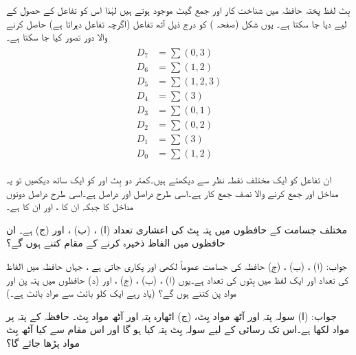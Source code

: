  بِٹ لفظ پختہ حافظہ میں شناخت کار اور  جمع گیٹ موجود ہوتے ہیں لہٰذا اس کو  تفاعل کے حصول کے لیے  دیا جا سکتا ہے۔ یوں شکل    (صفحہ ) کو درج ذیل آٹھ تفاعل (اگرچہ  تفاعل  دہراتا ہے) حاصل کرنے والا دور تصور کیا جا سکتا ہے۔
\begin{gather}
\begin{aligned}
D_7&=\sum (0,3)\\
D_6&=\sum(1,2)\\
D_5&=\sum (1,2,3)\\
D_4&=\sum(3)\\
D_3&=\sum(0,1)\\
D_2&=\sum (0,2)\\
D_1&=\sum(3)\\
D_0&=\sum(1,2)
\end{aligned}
\end{gather}

ان تفاعل کو ایک مختلف نقطہ نظر سے دیکھتے ہیں۔کمتر دو بِٹ  اور  کو ایک ساتھ  دیکھیں تو یہ مداخل  اور  جمع کرنے والا نصف جمع کار ہے۔اسی طرح  دراصل  اور  دراصل  ہے۔اسی طرح  دراصل دونوں مداخل کا  جبکہ  ان کا ،   اور  ان کا ہے۔

  مختلف جسامت کے حافظوں میں پتہ بِٹ  کی  اعشاری تعداد  (ا) ، (ب) ، اور  (ج)   ہے۔  ان حافظوں میں الفاظ ذخیرہ کرنے کے  مقام کتنے  ہوں گے؟
  
  جواب: (ا)  ، (ب) ، (ج) 
 حافظہ کی  جسامت  عموماً  لکھی اور پکاری جاتی ہے ، جہاں   حافظہ میں الفاظ کی تعداد اور  ایک لفظ میں بِٹوں کی تعداد  ہے۔یوں  (ا) ،  (ب)   ، (ج)  ، اور (د)     حافظوں میں پتہ پن  اور  مواد پن کتنے  ہوں گے؟ (یاد رہے  ایک کلو بائٹ سے مراد    بائٹ ہے۔)
 
 جواب: (ا)    سولہ  پتہ اور  آٹھ مواد بِٹ، (ج)  اٹھارہ پتہ اور آٹھ مواد بِٹ۔
 حافظہ کے   پتہ  پر  مواد لکھا ہے۔اس تک رسائی کے لیے سولہ بِٹ  پتہ کیا ہو گا اور اس  مقام سے کیا  آٹھ  بِٹ مواد  پڑھا جائے گا؟
 
